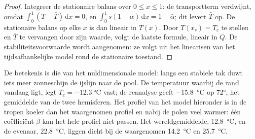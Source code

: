 \begin{proof}
Integreer de stationaire balans over $0 \le x \le 1$: de transportterm
verdwijnt, omdat $\int_0^1(T - \bar T)\,\mathrm dx = 0$, en $\int_0^1
s(1 - \alpha)\,\mathrm dx = 1 - \bar\alpha$; dit levert $\bar T$ op. De
stationaire balans op elke $x$ is dan lineair in $T(x)$. Door $T(x_s) = T_c$
te stellen en $\bar T$ te vervangen door zijn waarde, volgt de laatste formule, lineair in $Q$.
De stabiliteitsvoorwaarde wordt aangenomen: ze volgt uit het linearisen van
het tijdsafhankelijke model rond de stationaire toestand.
\end{proof}

De betekenis is die van het nuldimensionale model: langs een stabiele tak
duwt iets meer zonneschijn de ijslijn naar de pool. De temperatuur waarbij
de rand vandaag ligt, legt $T_c = \qty{-12.3}{\celsius}$ vast; de
reanalyse geeft \qty{-15.8}{\celsius} op \ang{72}, het gemiddelde van de twee
hemisferen. Het profiel van het model hieronder is in de tropen koeler dan het waargenomen
profiel en nabij de polen veel warmer: één coëfficiënt $\beta$ kan het hele
profiel niet passen. Het wereldgemiddelde,
\qty{12.8}{\celsius}, en de evenaar, \qty{22.8}{\celsius}, liggen dicht bij
de waargenomen \qty{14.2}{\celsius} en \qty{25.7}{\celsius}.

